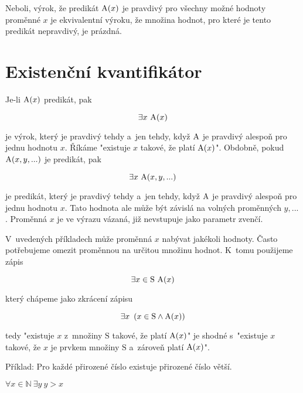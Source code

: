 Neboli, výrok, že predikát \(\mathrm{A}(x)\) je pravdivý pro všechny možné hodnoty proměnné \(x\) je ekvivalentní výroku, že množina hodnot, pro které je tento predikát nepravdivý, je prázdná.

\section{Existenční kvantifikátor}

Je-li \(\mathrm{A}(x)\) predikát, pak

\begin{equation}
\exists x \ \predicate{A}(x)
\end{equation}

je výrok, který je pravdivý tehdy a~jen tehdy, když \(\mathrm{A}\) je pravdivý alespoň pro jednu hodnotu \(x\). Říkáme "existuje \(x\) takové, že platí \(\mathrm{A}(x)\)". Obdobně, pokud \(\mathrm{A}(x, y, ...)\) je predikát, pak

\begin{equation}
\exists x \ \mathrm{A}(x, y, ...)
\end{equation}

je predikát, který je pravdivý tehdy a~jen tehdy, když \(\mathrm{A}\) je pravdivý alespoň pro jednu hodnotu \(x\). Tato hodnota ale může být závislá na volných proměnných \(y, ...\). Proměnná \(x\) je ve výrazu vázaná, již nevstupuje jako parametr zvenčí.

V~uvedených příkladech může proměnná \(x\) nabývat jakékoli hodnoty. Často potřebujeme omezit proměnnou na určitou množinu hodnot. K~tomu použijeme zápis

\begin{equation}
\exists x \in \mathrm{S} \ \predicate{A}(x)
\end{equation}

který chápeme jako zkrácení zápisu

\begin{equation}
\exists x \ \left( x \in \mathrm{S} \land \mathrm{A}(x) \right)
\end{equation}

tedy "existuje \(x\) z~množiny \(\mathrm{S}\) takové, že platí \(\mathrm{A}(x)\)" je shodné s~"existuje \(x\) takové, že \(x\) je prvkem množiny \(\mathrm{S}\) a~zároveň platí \(\mathrm{A}(x)\)".

Příklad: Pro každé přirozené číslo existuje přirozené číslo větší. 

\(\forall x \in \mathbb{N} \ \exists y \ y > x\)

